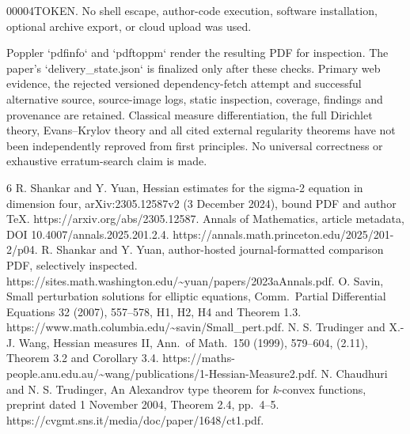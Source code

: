 \documentclass[10pt]{article}
\begin{document}
00004TOKEN. No shell escape, author-code execution, software installation, optional archive export, or cloud upload was used.\par
Poppler `pdfinfo` and `pdftoppm` render the resulting PDF for inspection. The paper’s `delivery\_state.json` is finalized only after these checks. Primary web evidence, the rejected versioned dependency-fetch attempt and successful alternative source, source-image logs, static inspection, coverage, findings and provenance are retained. Classical measure differentiation, the full Dirichlet theory, Evans–Krylov theory and all cited external regularity theorems have not been independently reproved from first principles. No universal correctness or exhaustive erratum-search claim is made.\par
6 R. Shankar and Y. Yuan, Hessian estimates for the sigma-2 equation in dimension four, arXiv:2305.12587v2 (3 December 2024), bound PDF and author TeX. https://arxiv.org/abs/2305.12587. Annals of Mathematics, article metadata, DOI 10.4007/annals.2025.201.2.4. https://annals.math.princeton.edu/2025/201-2/p04. R. Shankar and Y. Yuan, author-hosted journal-formatted comparison PDF, selectively inspected. https://sites.math.washington.edu/\textasciitilde{}yuan/papers/2023aAnnals.pdf. O. Savin, Small perturbation solutions for elliptic equations, Comm. Partial Differential Equations 32 (2007), 557–578, H1, H2, H4 and Theorem 1.3. https://www.math.columbia.edu/\textasciitilde{}savin/Small\_pert.pdf. N. S. Trudinger and X.-J. Wang, Hessian measures II, Ann. of Math. 150 (1999), 579–604, (2.11), Theorem 3.2 and Corollary 3.4. https://maths-people.anu.edu.au/\textasciitilde{}wang/publications/1-Hessian-Measure2.pdf. N. Chaudhuri and N. S. Trudinger, An Alexandrov type theorem for \(k\)-convex functions, preprint dated 1 November 2004, Theorem 2.4, pp. 4–5. https://cvgmt.sns.it/media/doc/paper/1648/ct1.pdf.\par
\end{document}
